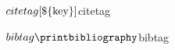 \documentclass{article}
\begin{document}
${citetag}\cite{${key}}${citetag}

${bibtag}\printbibliography ${bibtag}
\end{document}
